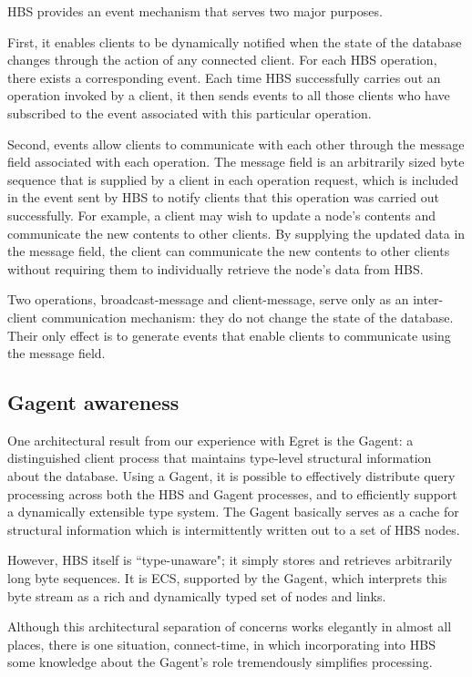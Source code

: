 HBS provides an event  mechanism that serves two major purposes.

First, it enables clients to be dynamically notified when the state of
the database changes through the action of any connected client.  
For each HBS operation,
there exists a corresponding event.  Each time HBS
successfully carries out an operation invoked by a client, it then
sends events to all those clients who have subscribed to the event
associated with this particular operation.

Second, events allow clients to communicate with each other through the
message field associated with each operation.  The message field is an
arbitrarily sized byte sequence that is supplied by a client in
each operation
request, which is included in the event sent by HBS to notify clients that
this operation was carried out successfully.
For example, a client may wish to update a node's contents and 
communicate the new contents to other clients.  By
supplying the updated data in the message field, the client can
communicate the new contents to other clients without requiring them to
individually retrieve the node's data from HBS.

Two operations, broadcast-message and client-message, serve only as an
inter-client communication mechanism: they do not change the state of
the database. Their only effect is to generate events that enable clients
to communicate using the message field.

\subsection{Gagent awareness}  

One architectural result from our experience with Egret is the
Gagent: a
distinguished client process that maintains type-level structural
information about the database.  Using a Gagent, it is possible to
effectively distribute query processing across both the HBS and Gagent
processes, and to efficiently support a dynamically extensible type system.
The Gagent basically serves as a cache for structural information which is
intermittently written out to a set of HBS nodes.

However, HBS itself is ``type-unaware"; it simply stores and retrieves
arbitrarily long byte sequences.  It is ECS, supported by the Gagent, which
interprets this byte stream as a rich and dynamically typed set of nodes
and links.  

Although this architectural separation of concerns works elegantly in
almost all places, there is one situation, connect-time, in which
incorporating into HBS some knowledge about the Gagent's role tremendously
simplifies processing.

